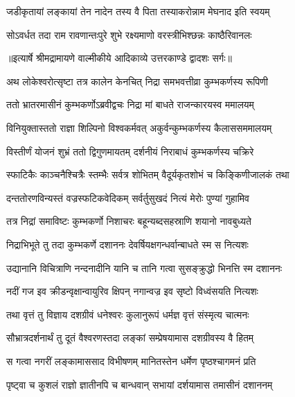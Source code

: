 \twolineshloka
{जडीकृतायां लङ्कायां तेन नादेन तस्य वै}
{पिता तस्याकरोन्नाम मेघनाद इति स्वयम्} %

\twolineshloka
{सोऽवर्धत तदा राम रावणान्तःपुरे शुभे}
{रक्ष्यमाणो वरस्त्रीभिश्छन्नः काष्ठैरिवानलः} %


{॥इत्यार्षे श्रीमद्रामायणे वाल्मीकीये आदिकाव्ये उत्तरकाण्डे द्वादशः सर्गः॥}


\twolineshloka
{अथ लोकेश्वरोत्सृष्टा तत्र कालेन केनचित्}
{निद्रा समभवत्तीव्रा कुम्भकर्णस्य रूपिणी} %

\twolineshloka
{ततो भ्रातरमासीनं कुम्भकर्णोऽब्रवीद्वचः}
{निद्रा मां बाधते राजन्कारयस्व ममालयम्} %

\twolineshloka
{विनियुक्तास्ततो राज्ञा शिल्पिनो विश्वकर्मवत्}
{अकुर्वन्कुम्भकर्णस्य कैलाससममालयम्} %

\twolineshloka
{विस्तीर्णं योजनं शुभ्रं ततो द्विगुणमायतम्}
{दर्शनीयं निराबाधं कुम्भकर्णस्य चक्रिरे} %

\twolineshloka
{स्फाटिकैः काञ्चनैश्चित्रैः स्तम्भैः सर्वत्र शोभितम्}
{वैदूर्यकृतशोभं च किङ्किणीजालकं तथा} %

\twolineshloka
{दन्ततोरणविन्यस्तं वज्रस्फटिकवेदिकम्}
{सर्वर्तुसुखदं नित्यं मेरोः पुण्यां गुहामिव} %

\twolineshloka
{तत्र निद्रां समाविष्टः कुम्भकर्णो निशाचरः}
{बहून्यब्दसहस्राणि शयानो नावबुध्यते} %

\twolineshloka
{निद्राभिभूते तु तदा कुम्भकर्णे दशाननः}
{देवर्षियक्षगन्धर्वान्बाधते स्म स नित्यशः} %

\twolineshloka
{उद्यानानि विचित्राणि नन्दनादीनि यानि च}
{तानि गत्वा सुसङ्क्रुद्धो भिनत्ति स्म दशाननः} %

\twolineshloka
{नदीं गज इव क्रीडन्वृक्षान्वायुरिव क्षिपन्}
{नगान्वज्र इव सृष्टो विध्वंसयति नित्यशः} %

\twolineshloka
{तथा वृत्तं तु विज्ञाय दशग्रीवं धनेश्वरः}
{कुलानुरूपं धर्मज्ञ वृत्तं संस्मृत्य चात्मनः} %

\twolineshloka
{सौभ्रात्रदर्शनार्थं तु दूतं वैश्वरणस्तदा}
{लङ्कां सम्प्रेषयामास दशग्रीवस्य वै हितम्} %

\twolineshloka
{स गत्वा नगरीं लङ्कामाससाद विभीषणम्}
{मानितस्तेन धर्मेण पृष्ठश्चागमनं प्रति} %

\twolineshloka
{पृष्ट्वा च कुशलं राज्ञो ज्ञातीनपि च बान्धवान्}
{सभायां दर्शयामास तमासीनं दशाननम्} %

